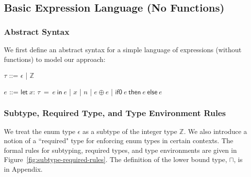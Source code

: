 \documentclass[peerreview, 10pt]{IEEEtran}
\newcommand{\Z}{\ensuremath{\mathbb{Z}}}
\newcommand{\lett}[4]{\ensuremath{\mathsf{let}\ #1\mathsf{:}\,#2\ \mathsf{=}\ #3\ \mathsf{in}\ #4}}
\newcommand{\binop}[2]{\ensuremath{#1\ \mathsf{\oplus}\ #2}}
\newcommand{\ternary}[3]{\ensuremath{\mathsf{if0}\ #1\ \mathsf{then}\ #2\ \mathsf{else}\ #3}}
\begin{document}
\subsection{Basic Expression Language (No Functions)}
\subsubsection{Abstract Syntax}
We first define an abstract syntax for a simple language of expressions (without functions) to model our approach:

\vspace{0.5em}
\begin{bnf}
    $\tau$ ::= $\epsilon$ | $\Z$
\end{bnf}

\begin{bnf}
    $e$ ::= \lett{x}{\tau}{e}{e} 
    | $x$ 
    | $n$ 
    | \binop{e}{e} 
    | \ternary{e}{e}{e}
\end{bnf}
\vspace{0.5em}

\subsubsection{Subtype, Required Type, and Type Environment Rules}
We treat the enum type $\epsilon$ as a subtype of the integer type $\Z$. We also introduce a notion of a ``required" type for enforcing enum types in certain contexts. The formal rules for subtyping, required types, and type environments are given in Figure~\ref{fig:subtype-required-rules}. The definition of the lower bound type, $\sqcap$, is in Appendix.
\end{document}
